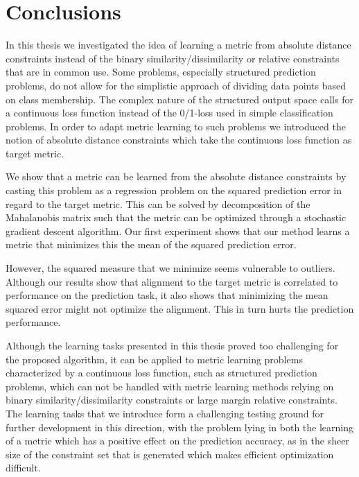 \chapter{Conclusions}

In this thesis we investigated the idea of learning a metric from absolute distance constraints instead of the binary similarity/dissimilarity or relative constraints that are in common use. Some problems, especially structured prediction problems, do not allow for the simplistic approach of dividing data points based on class membership. The complex nature of the structured output space calls for a continuous loss function instead of the 0/1-loss used in simple classification problems. In order to adapt metric learning to such problems we introduced the notion of absolute distance constraints which take the continuous loss function as target metric.

We show that a metric can be learned from the absolute distance constraints by casting this problem as a regression problem on the squared prediction error in regard to the target metric. This can be solved by decomposition of the Mahalanobis matrix such that the metric can be optimized through a stochastic gradient descent algorithm.  Our first experiment shows that our method learns a metric that minimizes this the mean of the squared prediction error.

However, the squared measure that we minimize seems vulnerable to outliers. Although our results show that alignment to the target metric is correlated to performance on the prediction task, it also shows that minimizing the mean squared error might not optimize the alignment. This in turn hurts the prediction performance.

Although the learning tasks presented in this thesis proved too challenging for the proposed algorithm, it can be applied to metric learning problems characterized by a continuous loss function, such as structured prediction problems, which can not be handled with metric learning methods relying on binary similarity/dissimilarity constraints or large margin relative constraints. The learning tasks that we introduce form a challenging testing ground for further development in this direction, with the problem lying in both the learning of a metric which has a positive effect on the prediction accuracy, as in the sheer size of the constraint set that is generated which makes efficient optimization difficult.